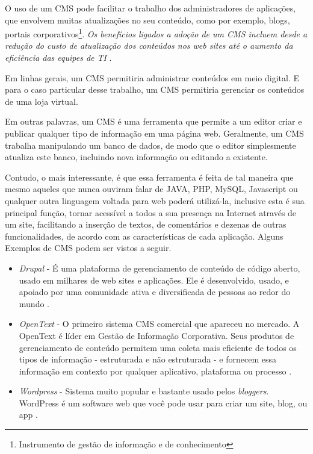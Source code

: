 \documentclass[a4paper,12pt]{monografia}
\begin{document}
O uso de um CMS pode facilitar o trabalho dos administradores de aplicações, que envolvem muitas atualizações no seu conteúdo, como por exemplo, blogs, portais corporativos\footnote{Instrumento de gestão de informação e de conhecimento}. \textit{Os benefícios ligados a adoção de um CMS incluem desde a redução do custo de atualização dos conteúdos nos web sites até o aumento da eficiência das equipes de TI} \cite{pereira}.

Em linhas gerais, um CMS permitiria administrar conteúdos em meio digital. E para o caso particular desse trabalho, um CMS permitiria gerenciar os conteúdos de uma loja virtual.

Em outras palavras, um CMS é uma ferramenta que permite a um editor criar e publicar qualquer tipo de informação em uma página web. Geralmente, um CMS trabalha manipulando um banco de dados, de modo que o editor simplesmente atualiza este banco, incluindo nova informação ou editando a existente.

Contudo, o mais interessante, é que essa ferramenta é feita de tal maneira que mesmo aqueles que nunca ouviram falar de JAVA, PHP, MySQL, Javascript ou qualquer outra linguagem voltada para web poderá utilizá-la, inclusive esta é sua principal função, tornar acessível a todos a sua presença na Internet através de um site, facilitando a inserção de textos, de comentários e dezenas de outras funcionalidades, de acordo com as características de cada aplicação. Alguns Exemplos de CMS podem ser vistos a seguir.

\begin{itemize}
\item \textit{Drupal} - É uma plataforma de gerenciamento de conteúdo de código aberto, usado em milhares de web sites e aplicações. Ele é desenvolvido, usado, e apoiado por uma comunidade ativa e diversificada de pessoas ao redor do mundo \cite{drupal}.

\item \textit{OpenText} \citeyear{opentext} - O primeiro sistema CMS comercial que apareceu no mercado. A OpenText é líder em Gestão de Informação Corporativa. Seus produtos de gerenciamento de conteúdo permitem uma coleta mais eficiente de todos os tipos de informação - estruturada e não estruturada - e fornecem essa informação em contexto por qualquer aplicativo, plataforma ou processo \cite{opentext}.

\item \textit{Wordpress} - Sistema muito popular e bastante usado pelos \textit{bloggers}. WordPress é um software web que você pode usar para criar um site, blog, ou app \cite{wordpress}.
\end{itemize}
\end{document}
